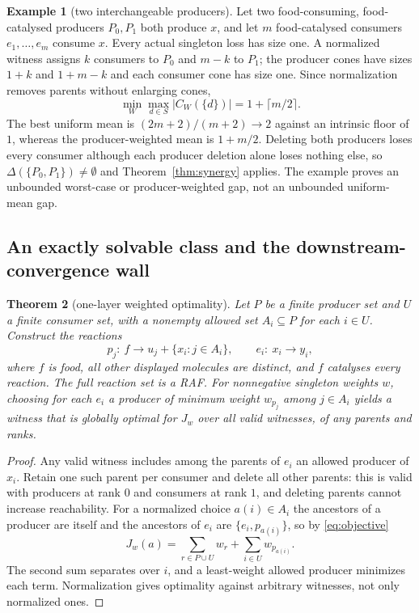 \documentclass[11pt,a4paper]{article}
\theoremstyle{plain}
\newtheorem{theorem}{Theorem}[section]
\theoremstyle{definition}
\newtheorem{example}[theorem]{Example}
\theoremstyle{remark}
\begin{document}
\begin{example}[two interchangeable producers]\label{ex:twoproducer}
Let two food-consuming, food-catalysed producers $P_0,P_1$ both produce $x$, and let $m$ food-catalysed consumers $e_1,\dots,e_m$ consume $x$. Every actual singleton loss has size one. A normalized witness assigns $k$ consumers to $P_0$ and $m-k$ to $P_1$; the producer cones have sizes $1+k$ and $1+m-k$ and each consumer cone has size one. Since normalization removes parents without enlarging cones,
\[
\min_{W}\max_{d\in S}|C_W(\{d\})|=1+\lceil m/2\rceil .
\]
The best uniform mean is $(2m+2)/(m+2)\to2$ against an intrinsic floor of $1$, whereas the producer-weighted mean is $1+m/2$. Deleting both producers loses every consumer although each producer deletion alone loses nothing else, so $\Delta(\{P_0,P_1\})\neq\emptyset$ and Theorem~\ref{thm:synergy} applies. The example proves an unbounded worst-case or producer-weighted gap, not an unbounded uniform-mean gap.
\end{example}

\subsection{An exactly solvable class and the downstream-convergence wall}

\begin{theorem}[one-layer weighted optimality]\label{thm:onelayer}
Let $P$ be a finite producer set and $U$ a finite consumer set, with a nonempty allowed set $A_i\subseteq P$ for each $i\in U$. Construct the reactions
\[
p_j:\ f\to u_j+\{x_i:j\in A_i\},\qquad e_i:\ x_i\to y_i,
\]
where $f$ is food, all other displayed molecules are distinct, and $f$ catalyses every reaction. The full reaction set is a RAF. For nonnegative singleton weights $w$, choosing for each $e_i$ a producer of minimum weight $w_{p_j}$ among $j\in A_i$ yields a witness that is globally optimal for $J_w$ over all valid witnesses, of any parents and ranks.
\end{theorem}

\begin{proof}
Any valid witness includes among the parents of $e_i$ an allowed producer of $x_i$. Retain one such parent per consumer and delete all other parents: this is valid with producers at rank $0$ and consumers at rank $1$, and deleting parents cannot increase reachability. For a normalized choice $a(i)\in A_i$ the ancestors of a producer are itself and the ancestors of $e_i$ are $\{e_i,p_{a(i)}\}$, so by \eqref{eq:objective}
\[
J_w(a)=\sum_{r\in P\cup U}w_r+\sum_{i\in U}w_{p_{a(i)}} .
\]
The second sum separates over $i$, and a least-weight allowed producer minimizes each term. Normalization gives optimality against arbitrary witnesses, not only normalized ones.
\end{proof}
\end{document}
